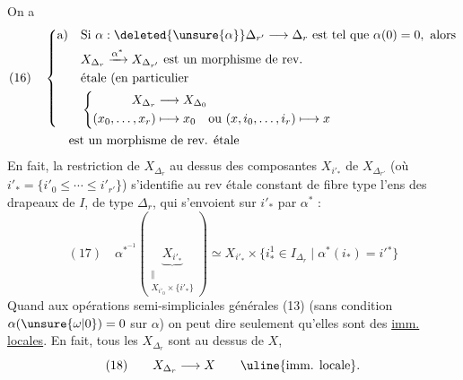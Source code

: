 On a
\[
\begin{aligned}
(16)\quad&
\left\{\begin{aligned}
\text{a)}\quad&\text{Si }\alpha:\deleted{\unsure{\alpha}}\Delta_{r'}\longrightarrow\Delta_r\text{ est tel que }\alpha(0)=0,\text{ alors}\\
&X_{\Delta_r}\xrightarrow{\alpha^*}X_{\Delta_{r'}}\text{ est un morphisme de rev.}\\
&\text{étale (en particulier}\\
&\left\{\begin{aligned}
X_{\Delta_r}&\longrightarrow X_{\Delta_0}\\
(x_0,\ldots,x_r)&\longmapsto x_0\quad\text{ou }(x,i_0,\ldots,i_r)\longmapsto x
\end{aligned}\right.
\end{aligned}\right.\\
&\qquad\text{est un morphisme de rev. étale}
\end{aligned}
\]
En fait, la  restriction de $X_{\Delta_r}$ au
dessus des composantes $X_{i'_*}$  de $X_{\Delta_{r'}}$
(où $i'_* = \{i'_0\leq\cdots\leq i'_{r'}\}$)  s'identifie
au rev étale constant de fibre type l'ens
des drapeaux  de $I$, de type $\Delta_r$, qui
s'envoient sur $i'_*$ par $\alpha^*$ :
\[
(17)\quad\alpha^{*^{-1}}\left(\underbrace{X_{i'_*}}_{\substack{\Vert\\X_{i'_0}\times\{i'_*\}}}\right)
\simeq X_{i'_*}\times\{i^1_*\in I_{\Delta_r}\mid\alpha^*(i_*)=i'{}^*\}
\]
Quand aux opérations semi-simpliciales
générales (13) (sans condition $\alpha(\unsure{\omega|0})=0$ sur
$\alpha$) on peut dire seulement qu'elles sont
des \uline{imm. locales}. En fait, tous les
$X_{\Delta_r}$ sont au dessus de $X$, 
\[
(18)\qquad X_{\Delta_r}\longrightarrow X\qquad\text{\uline{imm. locale}}.
\]
